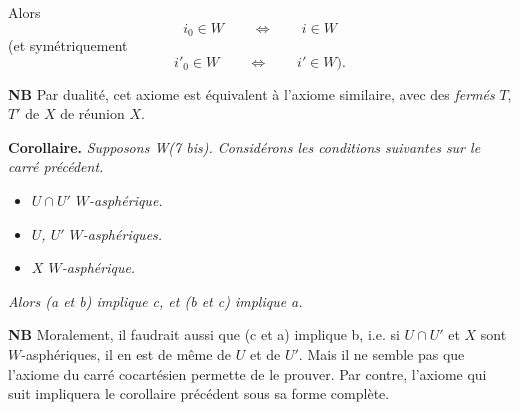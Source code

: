 \begin{description}[leftmargin=5em, style=nextline]
Alors
\[
i_0\in W\qquad\Longleftrightarrow\qquad i\in W
\]
(et symétriquement
\[
i'_0\in W\qquad\Longleftrightarrow\qquad i'\in W).
\]
\end{description}

\textbf{NB} Par dualité, cet axiome est équivalent à l'axiome similaire, avec des \textit{fermés} $T$, $T'$ de $X$ de réunion $X$.

\textbf{Corollaire.} \textit{Supposons \textup{W(7 bis)}. Considérons les conditions suivantes sur le carré précédent.}

\begin{itemize}
\item[\textit{a)}] \textit{$U\cap U'$ $W$-asphérique.}
\item[\textit{b)}] \textit{$U$, $U'$ $W$-asphériques.}
\item[\textit{c)}] \textit{$X$ $W$-asphérique.}
\end{itemize}

\textit{Alors (a et b) implique c, et (b et c) implique a.}

\textbf{NB} Moralement, il faudrait aussi que (c et a) implique b, i.e. si $U\cap U'$ et $X$ sont $W$-asphériques, il en est de même de $U$ et de $U'$. Mais il ne semble pas que l'axiome du carré cocartésien permette de le prouver. Par contre, l'axiome qui suit impliquera le corollaire précédent sous sa forme complète.


